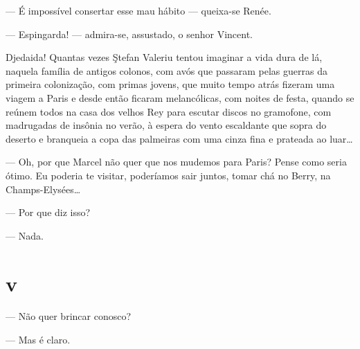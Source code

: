
--- É impossível consertar esse mau hábito --- queixa-se Renée.


--- Espingarda! --- admira-se, assustado, o senhor Vincent.


Djedaida! Quantas vezes Ştefan Valeriu tentou imaginar a vida dura de
lá, naquela família de antigos colonos, com avós que passaram pelas
guerras da primeira colonização, com primas jovens, que muito tempo
atrás fizeram uma viagem a Paris e desde então ficaram melancólicas, com
noites de festa, quando se reúnem todos na casa dos velhos Rey para
escutar discos no gramofone, com madrugadas de insônia no verão, à
espera do vento escaldante que sopra do deserto e branqueia a copa das
palmeiras com uma cinza fina e prateada ao luar\ldots{}

--- Oh, por que Marcel não quer que nos mudemos para Paris? Pense como
seria ótimo. Eu poderia te visitar, poderíamos sair juntos, tomar chá no
Berry, na Champs-Elysées\ldots{}


--- Por que diz isso?

--- Nada.

\section{v}

 


--- Não quer brincar conosco?

--- Mas é claro.


